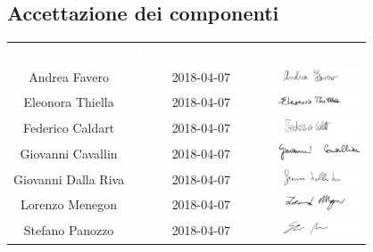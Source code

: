 \subsection{Accettazione dei componenti}
\begin{longtable}{ c  c  c }
	\rowcolor{bluSOS}
	\textcolor{white}{\textbf{Nominativo}} & \textcolor{white}{\textbf{Data di accettazione}} & \textcolor{white}{\textbf{Firma}}\\
	Andrea Favero & 2018-04-07 & \includegraphics[height=0.5cm]{img/Firme/AndreaFavero.png} \\
	
	Eleonora Thiella & 2018-04-07 & \includegraphics[height=0.5cm]{img/Firme/EleonoraThiella.png} \\
	
	Federico Caldart & 2018-04-07 & \includegraphics[height=0.5cm]{img/Firme/FedericoCaldart.png} \\
	
	Giovanni Cavallin & 2018-04-07 & \includegraphics[height=0.5cm]{img/Firme/GiovanniCavallin.png} \\
	
	Giovanni Dalla Riva & 2018-04-07 & \includegraphics[height=0.5cm]{img/Firme/GiovanniDallaRiva.png} \\
	
	Lorenzo Menegon & 2018-04-07 & \includegraphics[height=0.5cm]{img/Firme/LorenzoMenegon.png} \\
	
	Stefano Panozzo & 2018-04-07 & \includegraphics[height=0.5cm]{img/Firme/StefanoPanozzo.png} \\
\end{longtable}

